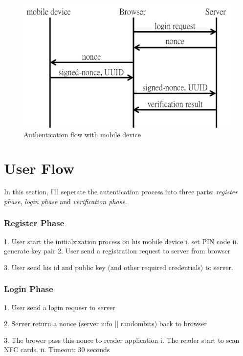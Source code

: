 \begin{CJK}{Bg5}{bsmi}
\begin{figure}
\centering
\label{fig:final-flow}
\includegraphics[scale=0.65]{picture/final-flow.png}
\caption{Authentication flow with mobile device}
\end{figure}

\section{User Flow}

In this section, I'll seperate the autentication process into three parts: \emph{register phase}, \emph{login phase} and \emph{verification phase}.

\subsubsection{Register Phase}

	1. 	User start the initialzization process on his mobile device
		i.  set PIN code
		ii. generate key pair
	2.	User send a registration request to server from browser

	3.	User send his id and public key (and other required credentials) to server.

\subsubsection{Login Phase}

	1. User send a login requesr to server

	2. Server return a nonce ({server info || randombits}) back to browser

	3. The brower pass this nonce to reader application
		i.	The reader start to scan NFC cards.
		ii.	Timeout: 30 seconds


\end{CJK}

